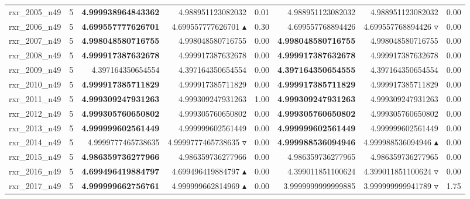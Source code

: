 \begin{table}[]
{\begin{tabular}{ll@{\hspace{1.2cm}}rrr@{\hspace{1.2cm}}rrr}
rxr_2005_n49 & 5 & \textbf{4.999938964843362} & 4.988951123082032 \phantom{$\blacktriangle$} & 0.01 & 4.988951123082032 & 4.988951123082032 \phantom{$\blacktriangle$} & 0.00 \\
rxr_2006_n49 & 5 & \textbf{4.699557777626701} & 4.699557777626701 $\blacktriangle$ & 0.30 & 4.699557768894426 & 4.699557768894426 $\triangledown$ & 0.00 \\
rxr_2007_n49 & 5 & \textbf{4.998048580716755} & 4.998048580716755 \phantom{$\blacktriangle$} & 0.00 & \textbf{4.998048580716755} & 4.998048580716755 \phantom{$\blacktriangle$} & 0.00 \\
rxr_2008_n49 & 5 & \textbf{4.999917387632678} & 4.999917387632678 \phantom{$\blacktriangle$} & 0.00 & \textbf{4.999917387632678} & 4.999917387632678 \phantom{$\blacktriangle$} & 0.00 \\
rxr_2009_n49 & 5 & 4.397164350654554 & 4.397164350654554 \phantom{$\blacktriangle$} & 0.00 & \textbf{4.397164350654555} & 4.397164350654554 \phantom{$\blacktriangle$} & 0.00 \\
rxr_2010_n49 & 5 & \textbf{4.999917385711829} & 4.999917385711829 \phantom{$\blacktriangle$} & 0.00 & \textbf{4.999917385711829} & 4.999917385711829 \phantom{$\blacktriangle$} & 0.00 \\
rxr_2011_n49 & 5 & \textbf{4.999309247931263} & 4.999309247931263 \phantom{$\blacktriangle$} & 1.00 & \textbf{4.999309247931263} & 4.999309247931263 \phantom{$\blacktriangle$} & 0.00 \\
rxr_2012_n49 & 5 & \textbf{4.999305760650802} & 4.999305760650802 \phantom{$\blacktriangle$} & 0.00 & \textbf{4.999305760650802} & 4.999305760650802 \phantom{$\blacktriangle$} & 0.00 \\
rxr_2013_n49 & 5 & \textbf{4.999999602561449} & 4.999999602561449 \phantom{$\blacktriangle$} & 0.00 & \textbf{4.999999602561449} & 4.999999602561449 \phantom{$\blacktriangle$} & 0.00 \\
rxr_2014_n49 & 5 & 4.9999777465738635 & 4.9999777465738635 $\triangledown$ & 0.00 & \textbf{4.999988536094946} & 4.999988536094946 $\blacktriangle$ & 0.00 \\
rxr_2015_n49 & 5 & \textbf{4.986359736277966} & 4.986359736277966 \phantom{$\blacktriangle$} & 0.00 & 4.986359736277965 & 4.986359736277965 \phantom{$\blacktriangle$} & 0.00 \\
rxr_2016_n49 & 5 & \textbf{4.699496419884797} & 4.699496419884797 $\blacktriangle$ & 0.00 & 4.399011851100624 & 4.399011851100624 $\triangledown$ & 0.00 \\
rxr_2017_n49 & 5 & \textbf{4.999999662756761} & 4.999999662814969 $\blacktriangle$ & 0.00 & 3.9999999999999885 & 3.999999999941789 $\triangledown$ & 1.75 \\

\end{tabular}}
\end{table}
